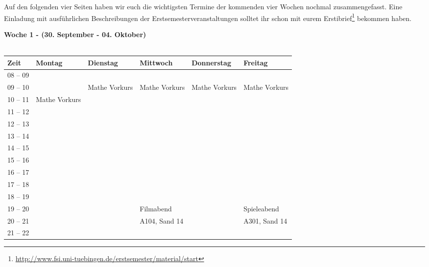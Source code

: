 Auf den folgenden vier Seiten haben wir euch die wichtigsten Termine der kommenden vier Wochen nochmal zusammengefasst. Eine Einladung mit ausführlichen Beschreibungen der Erstsemesterveranstaltungen solltet ihr schon mit eurem Erstibrief\footnote{\url{http://www.fsi.uni-tuebingen.de/erstsemester/material/start}} bekommen haben.
\vfill




\textbf{Woche 1 - (30. September - 04. Oktober)}\\
\\
\begin{tabular}{|l|p{}|p{}|p{}|p{}|p{}|} \hline
 Zeit & Montag & Dienstag & Mittwoch & Donnerstag & Freitag \\ 
 \hline \hline
 08 -- 09 & & & & & \\ \cline{1-1} 
\cline{3-6}
 09 -- 10 & & \footnotesize{Mathe Vorkurs} &\footnotesize{Mathe Vorkurs} & \footnotesize{Mathe Vorkurs} & \footnotesize{Mathe Vorkurs} \\ \cline{1-2}
 10 -- 11 & \footnotesize{Mathe Vorkurs} & & & & \\ \cline{1-1}
 11 -- 12 & & & & & \\ \cline{1-1}
 12 -- 13 & & & & & \\ \cline{1-1}
 13 -- 14 & & & & & \\ \cline{1-1}
 14 -- 15 & & & & & \\ \cline{1-1}
 15 -- 16 & & & & & \\ \hline
 16 -- 17 & & & & & \\ \cline{1-1}
 17 -- 18 & & & & & \\ \cline{1-1}
 18 -- 19 & & & & & \\ \cline{1-1}
 19 -- 20 & & &\footnotesize{Filmabend} \cellcolor{lightlightgray} & & \cellcolor{lightlightgray} \footnotesize{Spieleabend}  \\ \cline{1-1} \cline{4-4}\cline{6-6}
 20 -- 21 & & &\scriptsize{A104, Sand 14} \cellcolor{lightlightgray}&  & \scriptsize{A301, Sand 14} \cellcolor{lightlightgray} \\ \cline{1-1}
 21 -- 22 & & &\cellcolor{lightlightgray} & & \\ \hline
 \end{tabular}
\vfil

